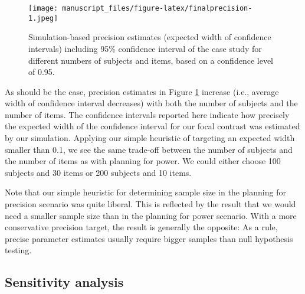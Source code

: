 \documentclass[
  man,floatsintext]{apa6}
\begin{document}
\begin{figure}
\centering
\texttt{[image: manuscript\_files/figure-latex/finalprecision-1.jpeg]}
\caption{\label{fig:finalprecision}Simulation-based precision estimates (expected width of confidence intervals) including 95\% confidence interval of the case study for different numbers of subjects and items, based on a confidence level of 0.95.}
\end{figure}

As should be the case, precision estimates in Figure \ref{fig:finalprecision} increase (i.e., average width of confidence interval decreases) with both the number of subjects and the number of items.
The confidence intervals reported here indicate how precisely the expected width of the confidence interval for our focal contrast was estimated by our simulation.
Applying our simple heuristic of targeting an expected width smaller than 0.1, we see the same trade-off between the number of subjects and the number of items as with planning for power.
We could either choose 100 subjects and 30 items or 200 subjects and 10 items.

Note that our simple heuristic for determining sample size in the planning for precision scenario was quite liberal.
This is reflected by the result that we would need a smaller sample size than in the planning for power scenario.
With a more conservative precision target, the result is generally the opposite: As a rule, precise parameter estimates usually require bigger samples than null hypothesis testing.

\hypertarget{sensitivity-analysis}{%
\subsection{Sensitivity analysis}\label{sensitivity-analysis}}
\end{document}
